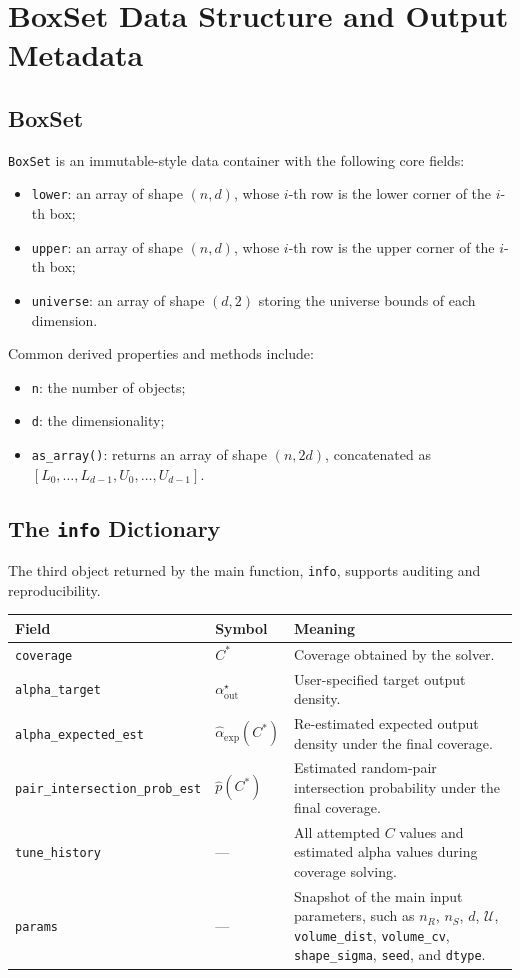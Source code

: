\documentclass[11pt,a4paper]{article}
\newcommand{\Uset}{\mathcal{U}}
\newcommand{\dtype}{\texttt{dtype}}
\newcommand{\code}[1]{\texttt{#1}}
\begin{document}
\section{BoxSet Data Structure and Output Metadata}

\subsection{BoxSet}

\code{BoxSet} is an immutable-style data container with the following core fields:
\begin{itemize}
  \item \code{lower}: an array of shape $(n,d)$, whose $i$-th row is the lower corner of the $i$-th box;
  \item \code{upper}: an array of shape $(n,d)$, whose $i$-th row is the upper corner of the $i$-th box;
  \item \code{universe}: an array of shape $(d,2)$ storing the universe bounds of each dimension.
\end{itemize}
Common derived properties and methods include:
\begin{itemize}
  \item \code{n}: the number of objects;
  \item \code{d}: the dimensionality;
  \item \code{as\_array()}: returns an array of shape $(n,2d)$, concatenated as $[L_0,\dots,L_{d-1},U_0,\dots,U_{d-1}]$.
\end{itemize}

\subsection{The \code{info} Dictionary}

The third object returned by the main function, \code{info}, supports auditing and reproducibility.

\begin{longtable}{>{\raggedright\arraybackslash}p{5.8cm}p{2.5cm}p{6.1cm}}
\toprule
\textbf{Field} & \textbf{Symbol} & \textbf{Meaning} \\
\midrule
\endhead
\code{coverage} & $C^*$ & Coverage obtained by the solver. \\
\code{alpha\_target} & $\alpha_{\mathrm{out}}^\star$ & User-specified target output density. \\
\code{alpha\_expected\_est} & $\widehat\alpha_{\mathrm{exp}}(C^*)$ & Re-estimated expected output density under the final coverage. \\
\code{pair\_intersection\_prob\_est} & $\widehat p(C^*)$ & Estimated random-pair intersection probability under the final coverage. \\
\code{tune\_history} & --- & All attempted $C$ values and estimated alpha values during coverage solving. \\
\code{params} & --- & Snapshot of the main input parameters, such as $n_R$, $n_S$, $d$, $\Uset$, \code{volume\_dist}, \code{volume\_cv}, \code{shape\_sigma}, \code{seed}, and \dtype. \\
\bottomrule
\end{longtable}
\end{document}
